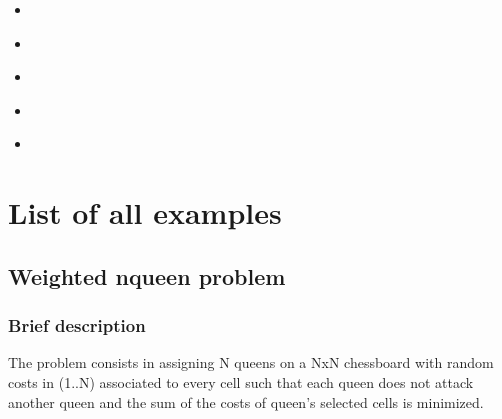\documentclass[letterpaper,10pt,openany,oneside,english]{sphinxmanual}
\let\sphinxpxdimen\pdfpxdimen\else\newdimen\sphinxpxdimen
\begin{document}
\begin{itemize}
\item {} 
\sphinxAtStartPar
{\hyperref[\detokenize{examples/tuto_bcp:tuto-bcp}]{}}

\item {} 
\sphinxAtStartPar
{\hyperref[\detokenize{examples/ltps:ltps}]{}}

\item {} 
\sphinxAtStartPar
{\hyperref[\detokenize{examples/rccs:rccs}]{}}

\item {} 
\sphinxAtStartPar
{\hyperref[\detokenize{examples/vstut:vs-tut}]{}} \sphinxincludegraphics[width=30\sphinxpxdimen]{{logo-colab}.png}

\item {} 
\sphinxAtStartPar
{\hyperref[\detokenize{examples/snum:snum}]{}}

\end{itemize}


\chapter{List of all examples}
\label{\detokenize{examples/tutorials_pdf:list-of-all-examples}}\label{\detokenize{examples/tutorials_pdf:examples-toc}}
\sphinxstepscope


\section{Weighted n\sphinxhyphen{}queen problem}
\label{\detokenize{examples/tuto_wnqp:weighted-n-queen-problem}}\label{\detokenize{examples/tuto_wnqp:tuto-wnqp}}\label{\detokenize{examples/tuto_wnqp::doc}}



\subsection{Brief description}
\label{\detokenize{examples/tuto_wnqp:brief-description}}
\sphinxAtStartPar
The problem consists in assigning N queens on a NxN chessboard with random costs in (1..N) associated to every cell such that each queen does not attack another queen and the sum of the costs of queen’s selected cells is minimized.
\end{document}
